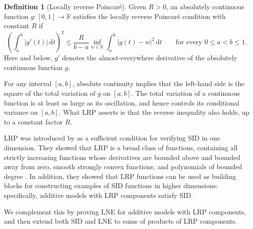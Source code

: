 \documentclass[11pt]{article}
\theoremstyle{plain}
\theoremstyle{definition}
\newtheorem{definition}[theorem]{Definition}
\theoremstyle{remark}
\theoremstyle{plain}
\newcommand{\1}{\mathbbm{1}}
\begin{document}
\begin{definition}[Locally reverse Poincar\'e] \label{def:LRP}
Given $R>0$, an absolutely continuous function
$g\colon[0,1]\to\mathbb R$ satisfies the locally reverse
Poincar\'e condition with constant $R$ if
\begin{equation}
\label{eq:assum-TV}
\left(\int_a^b |g'(t)|\,\mathrm{d}t\right)^2
\le
\frac{R}{b-a}
\inf_{w\in\mathbb R}
\int_a^b |g(t)-w|^2\,\mathrm{d}t
\qquad
\text{for every }0\leq a<b\leq 1.
\end{equation}
Here and below, $g'$ denotes the almost-everywhere derivative of the
absolutely continuous function $g$.
\end{definition}

For any interval $[a,b]$, absolute continuity implies that the left-hand side is the square of the total variation of $g$ on $[a,b]$.
The total variation of a continuous function is at least as large as its oscillation, and hence controls its conditional variance on $[a,b]$.
What LRP asserts is that the reverse inequality also holds, up to a constant factor $R$.

LRP was introduced by \citet{Mazumder2024} as a sufficient condition for verifying SID in one dimension.
They showed that LRP is a broad class of functions, containing all
strictly increasing functions whose derivatives are bounded above and bounded away from zero,
smooth strongly convex functions,
and polynomials of bounded degree \citep[Examples~3.1--3.3]{Mazumder2024}.
In addition, they showed that LRP functions can be used as building blocks for constructing examples of SID functions in higher dimensions: specifically, additive models with LRP components satisfy SID.

We complement this by proving LNE for additive models with LRP components, and then extend both SID and LNE to sums of products of LRP components.



\end{document}
